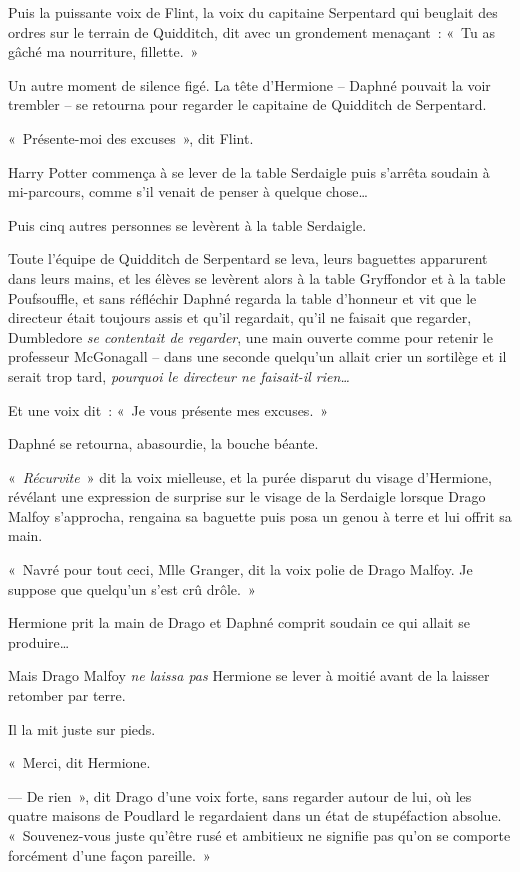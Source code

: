 Puis la puissante voix de Flint, la voix du capitaine Serpentard qui beuglait des ordres sur le terrain de Quidditch, dit avec un grondement menaçant~: «~Tu as gâché ma nourriture, fillette.~»

Un autre moment de silence figé. La tête d'Hermione -- Daphné pouvait la voir trembler -- se retourna pour regarder le capitaine de Quidditch de Serpentard.

«~Présente-moi des excuses~», dit Flint.

Harry Potter commença à se lever de la table Serdaigle puis s'arrêta soudain à mi-parcours, comme s'il venait de penser à quelque chose…

Puis cinq autres personnes se levèrent à la table Serdaigle.

Toute l'équipe de Quidditch de Serpentard se leva, leurs baguettes apparurent dans leurs mains, et les élèves se levèrent alors à la table Gryffondor et à la table Poufsouffle, et sans réfléchir Daphné regarda la table d'honneur et vit que le directeur était toujours assis et qu'il regardait, qu'il ne faisait que regarder, Dumbledore \emph{se contentait de regarder}, une main ouverte comme pour retenir le professeur McGonagall -- dans une seconde quelqu'un allait crier un sortilège et il serait trop tard, \emph{pourquoi le directeur ne faisait-il rien…}

Et une voix dit~: «~Je vous présente mes excuses.~»

Daphné se retourna, abasourdie, la bouche béante.

«~\emph{Récurvite}~» dit la voix mielleuse, et la purée disparut du visage d'Hermione, révélant une expression de surprise sur le visage de la Serdaigle lorsque Drago Malfoy s'approcha, rengaina sa baguette puis posa un genou à terre et lui offrit sa main.

«~Navré pour tout ceci, Mlle Granger, dit la voix polie de Drago Malfoy. Je suppose que quelqu'un s'est crû drôle.~»

Hermione prit la main de Drago et Daphné comprit soudain ce qui allait se produire…

Mais Drago Malfoy \emph{ne laissa pas} Hermione se lever à moitié avant de la laisser retomber par terre.

Il la mit juste sur pieds.

«~Merci, dit Hermione.

--- De rien~», dit Drago d'une voix forte, sans regarder autour de lui, où les quatre maisons de Poudlard le regardaient dans un état de stupéfaction absolue. «~Souvenez-vous juste qu'être rusé et ambitieux ne signifie pas qu'on se comporte forcément d'une façon pareille.~»

